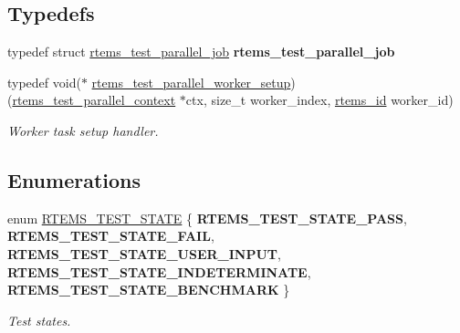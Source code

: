 \subsection*{Typedefs}
\begin{DoxyCompactItemize}
\item 
\mbox{\label{group__RTEMSTest_gaa667310622867cf1fd814cdf60d84591}} 
typedef struct \mbox{\hyperlink{structrtems__test__parallel__job}{rtems\+\_\+test\+\_\+parallel\+\_\+job}} {\bfseries rtems\+\_\+test\+\_\+parallel\+\_\+job}
\item 
typedef void($\ast$ \mbox{\hyperlink{group__RTEMSTest_ga89f4019d001f65865999e823e35dfdcb}{rtems\+\_\+test\+\_\+parallel\+\_\+worker\+\_\+setup}}) (\mbox{\hyperlink{structrtems__test__parallel__context}{rtems\+\_\+test\+\_\+parallel\+\_\+context}} $\ast$ctx, size\+\_\+t worker\+\_\+index, \mbox{\hyperlink{group__ClassicTasks_gab20892b814dced7dd4e5b9bf42becd57}{rtems\+\_\+id}} worker\+\_\+id)
\begin{DoxyCompactList}\small\item\em Worker task setup handler. \end{DoxyCompactList}\end{DoxyCompactItemize}
\subsection*{Enumerations}
\begin{DoxyCompactItemize}
\item 
\mbox{\label{group__RTEMSTest_gab272ab809e3df25459e5cb8a66762e52}} 
enum \mbox{\hyperlink{group__RTEMSTest_gab272ab809e3df25459e5cb8a66762e52}{R\+T\+E\+M\+S\+\_\+\+T\+E\+S\+T\+\_\+\+S\+T\+A\+TE}} \{ \newline
{\bfseries R\+T\+E\+M\+S\+\_\+\+T\+E\+S\+T\+\_\+\+S\+T\+A\+T\+E\+\_\+\+P\+A\+SS}, 
{\bfseries R\+T\+E\+M\+S\+\_\+\+T\+E\+S\+T\+\_\+\+S\+T\+A\+T\+E\+\_\+\+F\+A\+IL}, 
{\bfseries R\+T\+E\+M\+S\+\_\+\+T\+E\+S\+T\+\_\+\+S\+T\+A\+T\+E\+\_\+\+U\+S\+E\+R\+\_\+\+I\+N\+P\+UT}, 
{\bfseries R\+T\+E\+M\+S\+\_\+\+T\+E\+S\+T\+\_\+\+S\+T\+A\+T\+E\+\_\+\+I\+N\+D\+E\+T\+E\+R\+M\+I\+N\+A\+TE}, 
\newline
{\bfseries R\+T\+E\+M\+S\+\_\+\+T\+E\+S\+T\+\_\+\+S\+T\+A\+T\+E\+\_\+\+B\+E\+N\+C\+H\+M\+A\+RK}
 \}
\begin{DoxyCompactList}\small\item\em Test states. \end{DoxyCompactList}\end{DoxyCompactItemize}
